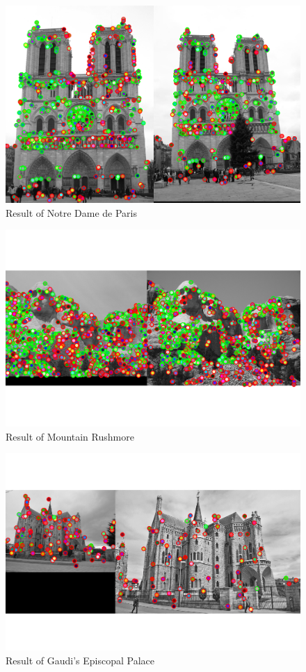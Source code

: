 \begin{figure}[h]
    \centering
    \includegraphics[width=12cm]{../code/eval_ND.png}
    \caption{Result of Notre Dame de Paris}
    \label{fig:Notre Dame de Paris}
\end{figure}

\begin{figure}[h]
    \centering
    \includegraphics[width=12cm]{../code/eval_MR.png}
    \caption{Result of Mountain Rushmore}
    \label{fig:Mountain Rushmore}
\end{figure}

\begin{figure}[h]
    \centering
    \includegraphics[width=12cm]{../code/eval_EG.png}
    \caption{Result of Gaudi's Episcopal Palace}
    \label{fig:Gaudi's Episcopal Palace}
\end{figure}

